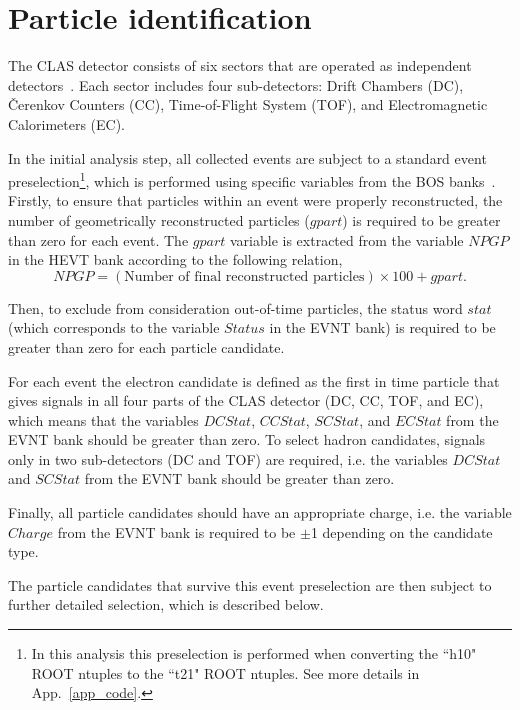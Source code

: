 \section{Particle identification}
\label{Sect:part_id}
The CLAS detector consists of six sectors that are operated as independent detectors~\cite{Mecking:2003zu}. Each sector includes four sub-detectors: Drift Chambers (DC), \v Cerenkov Counters (CC), Time-of-Flight System (TOF), and Electromagnetic Calorimeters (EC).


In the initial analysis step, all collected events are subject to a standard event preselection\footnote[2]{In this analysis this preselection is performed when converting the ``h10" ROOT ntuples to the ``t21" ROOT ntuples. See more details in App.~\ref{app_code}.}, which is performed using specific variables from the BOS banks~\cite{BOS:bank,Stepanyan:1999}. Firstly, to ensure that particles within an event were properly reconstructed, the number of geometrically reconstructed particles ($gpart$) is required to be greater than zero for each event. The $gpart$ variable is extracted from the variable $NPGP$ in the HEVT bank according to the following relation,
\begin{equation}
NPGP=(\text{Number of final reconstructed particles})\times100 + gpart.
\end{equation}

Then, to exclude from consideration out-of-time particles, the status word $stat$ (which corresponds to the variable $Status$ in the EVNT bank) is required to be greater than zero for each particle candidate.

For each event the electron candidate is defined as the first in time particle that gives signals in all four parts of the CLAS detector (DC, CC, TOF, and EC), which means that the variables $DCStat$, $CCStat$, $SCStat$, and $ECStat$ from the EVNT bank should be greater than zero. To select hadron candidates, signals only in two sub-detectors (DC and TOF) are required, i.e. the variables $DCStat$ and $SCStat$ from the EVNT bank should be greater than zero.


Finally, all particle candidates should have an appropriate charge, i.e. the variable $Charge$ from the EVNT bank is required to be $\pm$1 depending on the candidate type.


The particle candidates that survive this event preselection are then subject to further detailed selection, which is described below.



